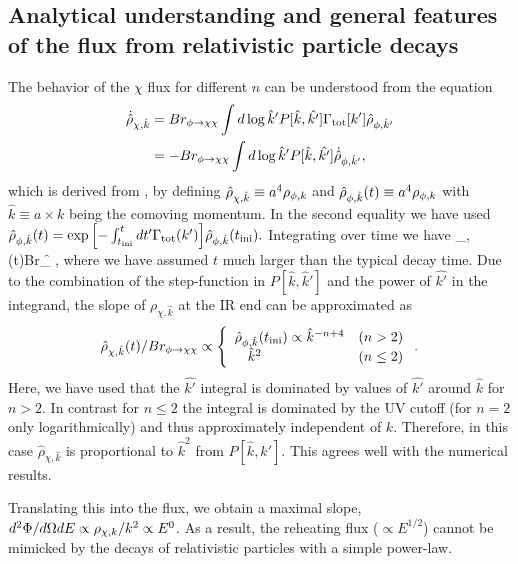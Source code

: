 \documentclass[superscriptaddress,aps,preprintnumbers,amsmath,showpacs,amssymb,prd,nofootinbib,reprint]{revtex4-1}
\begin{document}
{\subsection{Analytical understanding and general features of the flux from relativistic particle decays}

The behavior of the $\chi$ flux for different $n$
can be understood from the equation 
\begin{align}
 \dot{\hat{\rho}}_{\chi,\hat{k}}&=Br_{\phi \to \chi\chi} \int{d \log \hat{k}' P[\hat{k}, \hat{k'}]\Gamma_{\rm tot}[k'] \hat{\rho}_{\phi,\hat{ k}'}} \\
 &= -Br_{\phi \to \chi\chi} \int{d \log \hat{k}' P[\hat{k}, \hat{k'}]\dot{ \hat{\rho}}_{\phi,\hat{ k}'}},
\end{align}
which is derived from , by defining $\hat{\rho}_{\chi,\hat{k}}\equiv a^4{\rho}_{\phi, k}$ and  $\hat{\rho}_{\phi,\hat{k}}(t)\equiv a^4{\rho}_{\phi, k}$  with $\hat{k}\equiv a \times k$ being the comoving momentum. In the second equality we have used 
$\hat{\rho}_{\phi,\hat{k}}(t)=\exp{\left[-\int_{t_{\rm ini}}^t{dt'\Gamma_{\rm tot}(k') }\right]}\hat{\rho}_{\phi, \hat{k}}(t_{\rm ini}).$ 
Integrating over time we have 
\beq
{}
\hat{\rho}_{\chi, }(t)\simeq Br_{\f \to \chi\chi} ,
\eeq
where we have assumed $t$ much larger than the typical decay time.
Due to the combination of the step-function in $P[\hat{k},\hat{ k}']$ and the power of $\hat{k'}$ in the integrand, 
the slope of $\rho_{\chi,\hat{k}}$ at the IR end can be approximated as 
\begin{align} 
\label{eq:slopes}
\hat{\rho}_{\chi,\hat{k} }(t)/Br_{\phi \to \chi\chi}
\propto  \left\{
\begin{array}{cc} 
    \hat{\rho}_{\phi,\hat{ k}}(t_{\rm ini})\propto   \hat{k}^{-n+4} &(n> 2) \\  \hat{k}^2  ~~~~~~~~~~~~~~~& (n \leq 2)
\end{array}\right..
\end{align}
Here, we have used that 
the $\hat{k'}$ integral is dominated by values of $\hat{k'}$ around $\hat{k}$ for $n>2$. In contrast for  
$n\leq 2$
the integral is dominated by the UV cutoff (for $n=2$ only logarithmically) 
and thus
approximately independent of $k$. 
Therefore, in this case $\hat{\rho}_{\chi,\hat{k}}$ is proportional to
$\hat{k}^2$ from $P[\hat{k},\hat{k}']$.
This agrees well with the numerical results. 


Translating this into the flux, 
we obtain a maximal slope, $d^2\Phi/d\Omega d E\propto \rho_{\chi,k}/k^2\propto E^0$. As a result, the reheating flux ($\propto E^{1/2}$) cannot be mimicked by the  decays of relativistic particles with a simple power-law. 

}
\end{document}
